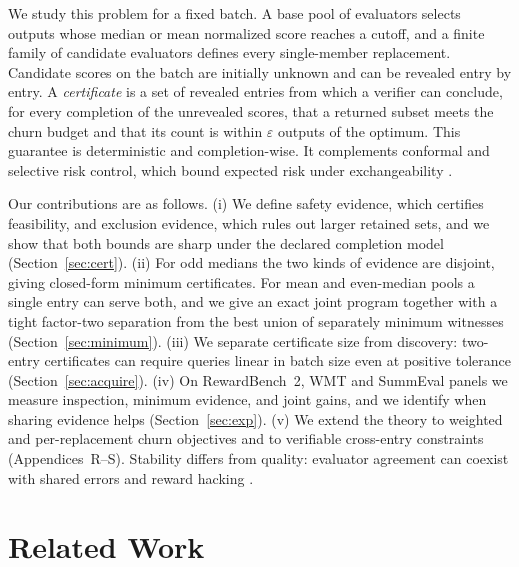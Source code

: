 \documentclass[11pt]{article}
\begin{document}
We study this problem for a fixed batch. A base pool of evaluators selects outputs whose median or mean normalized score reaches a cutoff, and a finite family of candidate evaluators defines every single-member replacement. Candidate scores on the batch are initially unknown and can be revealed entry by entry. A \emph{certificate} is a set of revealed entries from which a verifier can conclude, for every completion of the unrevealed scores, that a returned subset meets the churn budget and that its count is within $\varepsilon$ outputs of the optimum. This guarantee is deterministic and completion-wise. It complements conformal and selective risk control, which bound expected risk under exchangeability \citep{angelopoulos2024crc,bai2026score}.

Our contributions are as follows.
(i) We define safety evidence, which certifies feasibility, and exclusion evidence, which rules out larger retained sets, and we show that both bounds are sharp under the declared completion model (Section~\ref{sec:cert}).
(ii) For odd medians the two kinds of evidence are disjoint, giving closed-form minimum certificates. For mean and even-median pools a single entry can serve both, and we give an exact joint program together with a tight factor-two separation from the best union of separately minimum witnesses (Section~\ref{sec:minimum}).
(iii) We separate certificate size from discovery: two-entry certificates can require queries linear in batch size even at positive tolerance (Section~\ref{sec:acquire}).
(iv) On RewardBench~2, WMT and SummEval panels we measure inspection, minimum evidence, and joint gains, and we identify when sharing evidence helps (Section~\ref{sec:exp}).
(v) We extend the theory to weighted and per-replacement churn objectives and to verifiable cross-entry constraints (Appendices~R--S).
Stability differs from quality: evaluator agreement can coexist with shared errors and reward hacking \citep{eisenstein2024herding}.

\section{Related Work}
\end{document}
